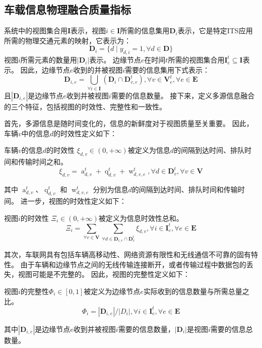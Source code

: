 \subsection{车载信息物理融合质量指标}
系统中的视图集合用$\mathbf{I}$表示，视图$i \in \mathbf{I}$所需的信息集用$\mathbf{D}_{i}$表示，它是特定ITS应用所需的物理交通元素的映射，它表示为：
\begin{equation}
	\mathbf{D}_{i} = \{d \mid y_{d, i} = 1, \forall d \in \mathbf{D} \}
\end{equation}
视图$i$所需元素的数量用$|\mathbf{D}_{i}|$表示。
边缘节点$e$在时间$t$所需的视图集合用$\mathbf{I}_e^t \subseteq \mathbf{I}$表示。
因此，边缘节点$e$收到的并被视图$i$需要的信息集用下式表示：
\begin{equation}
    \mathbf{D}_{i, e}=\bigcup_{\forall i \in \mathbf{I}}\left(\mathbf{D}_i \cap \mathbf{D}_{v, e}^t\right), \forall v \in \mathbf{V}_e^t, \forall e \in \mathbf{E}
\end{equation}
且$| \mathbf{D}_{i, e} |$是边缘节点$e$收到并被视图$i$需要的信息数量。
接下来，定义多源信息融合的三个特征，包括视图的时效性、完整性和一致性。

首先，多源信息是随时间变化的，信息的新鲜度对于视图质量至关重要。
因此，车辆$v$中的信息$d$的时效性定义如下：
\begin{definition}
	车辆$v$的信息$d$的时效性 $\xi_{d,v} \in (0, +\infty)$被定义为信息$d$的间隔到达时间、排队时间和传输时间之和。
	\begin{equation}
    	\xi_{d, v} = \operatorname{a}_{d, v}^t + \operatorname{q}_{d, v}^t + \operatorname{w}_{d, v, e}^t, \forall d \in \mathbf{D}_v^t, \forall v \in \mathbf{V}
	\end{equation}
\end{definition}
\noindent 其中 $\operatorname{a}_{d, v}^t$、$\operatorname{q}_{d, v}^t$ 和 $\operatorname{w}_{d, v, e}^t$ 分别为信息$d$的间隔到达时间、排队时间和传输时间。
进一步，视图的时效性定义如下：
\begin{definition}
视图$i$的时效性 $\Xi_{i} \in (0,+\infty)$被定义为信息时效性总和。
	\begin{equation}
    	\Xi_{i} = \sum_{\forall v \in \mathbf{V}} \sum_{\forall d \in \mathbf{D}_{i, e} \cap \mathbf{D}_v^t } \xi_{d, v}, \forall i \in \mathbf{I}_e^t, \forall e \in \mathbf{E}
	\end{equation}
\end{definition}

其次，车联网具有包括车辆高移动性、网络资源有限性和无线通信不可靠的固有特性。
由于车辆和边缘节点之间的无线传输连接断开，或者传输过程中数据包的丢失，视图可能是不完整的。
因此，视图的完整性定义如下：
\begin{definition}
	视图$i$的完整性$\Phi_{i} \in [0,1]$被定义为边缘节点$e$实际收到的信息数量与所需总量之比。
	\begin{equation}
	\Phi_{i}= {| \mathbf{D}_{i, e} |} \big/ {|D_{i} |}, \forall i \in \mathbf{I}_e^t, \forall e \in \mathbf{E}
	\end{equation}
\end{definition}
\noindent 其中$|\mathbf{D}_{i, e}|$是边缘节点$e$收到并被视图$i$需要的信息数量，$|\mathbf{D}_{i}|$是视图$i$需要的信息总数量。

